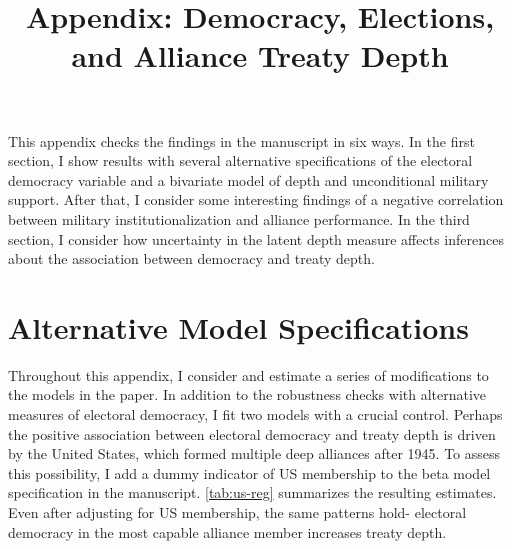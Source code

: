 \documentclass[12pt]{article}
\title{\textbf{Appendix: Democracy, Elections, and Alliance Treaty Depth}}
\author{}
\date{}
\begin{document}
\maketitle 

\doublespace 

This appendix checks the findings in the manuscript in six ways. 
In the first section, I show results with several alternative specifications of the electoral democracy variable and a bivariate model of depth and unconditional military support.
After that, I consider some interesting findings of a negative correlation between military institutionalization and alliance performance. 
In the third section, I consider how uncertainty in the latent depth measure affects inferences about the association between democracy and treaty depth. 


\section{Alternative Model Specifications} 


Throughout this appendix, I consider and estimate a series of modifications to the models in the paper.
In addition to the robustness checks with alternative measures of electoral democracy, I fit two models with a crucial control. 
Perhaps the positive association between electoral democracy and treaty depth is driven by the United States, which formed multiple deep alliances after 1945. 
To assess this possibility, I add a dummy indicator of US membership to the beta model specification in the manuscript. 
\autoref{tab:us-reg} summarizes the resulting estimates. 
Even after adjusting for US membership, the same patterns hold- electoral democracy in the most capable alliance member increases treaty depth. 
 
\end{document}
